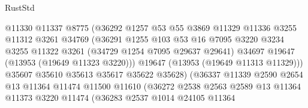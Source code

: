 \begin{lexlean}{RustStd}
\begin{coremodule}
                                  @11330
                                  @11337
                                  @8775
                                  (@36292
                                    @1257
                                    @53
                                    @55
                                    @3869
                                    @11329
                                    @11336
                                    @3255
                                    @11312
                                    @3261
                                    @34769
                                    (@36291
                                      @1255
                                      @103
                                      @53
                                      @16
                                      @7095
                                      @3220
                                      @3234
                                      @3255
                                      @11322
                                      @3261
                                      (@34729 @1254 @7095 @29637 @29641)
                                      @34697
                                      @19647
                                      (@13953 (@19649 @11323 @3220)))
                                    @19647
                                    (@13953 (@19649 @11313 @11329)))
                                  @35607
                                  @35610
                                  @35613
                                  @35617
                                  @35622
                                  @35628)
                                (@36337
                                  @11339
                                  @2590
                                  @2654
                                  @13
                                  @11364
                                  @11474
                                  @11500
                                  @11610
                                  (@36272
                                    @2538
                                    @2563
                                    @2589
                                    @13
                                    @11364
                                    @11373
                                    @3220
                                    @11474
                                    (@36283
                                      @2537
                                      @1014
                                      @24105
                                      @11364

\end{coremodule}
\end{lexlean}
